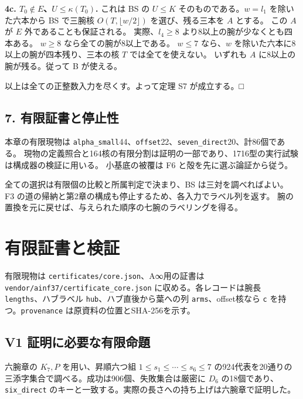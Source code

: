 \documentclass[
  10pt,
  a4paper,
]{article}
\begin{document}
\textbf{4c. \(T_0\notin E\)、\(U\le\kappa(T_0)\).} これは BS の
\(U\le K\) そのものである。\(w=l_1\) を除いた六本から BS で三腕核
\(O(T,\lfloor w/2\rfloor)\) を選び、残る三本を \(A\) とする。 この \(A\)
が \(E\) 外であることも保証される。 実際、\(l_4\ge8\)
より8以上の腕が少なくとも四本ある。 \(w\ge8\)
なら全ての腕が8以上である。 \(w\le7\) なら、\(w\)
を除いた六本に8以上の腕が四本残り、三本の核 \(T\) では全てを使えない。
いずれも \(A\) に8以上の腕が残る。従って B が使える。

以上は全ての正整数入力を尽くす。よって定理 S7 が成立する。□

\subsection{7.
有限証書と停止性}\label{ux6709ux9650ux8a3cux66f8ux3068ux505cux6b62ux6027}

本章の有限現物は
\texttt{alpha\_small}44、\texttt{offset}22、\texttt{seven\_direct}20、計86個である。
現物の定義照合と164核の有限分割は証明の一部であり、1716型の実行試験は構成器の検証に用いる。
小基底の被覆は F6 と殻を先に選ぶ論証から従う。

全ての選択は有限個の比較と所属判定で決まり、BS は三対を調べればよい。 F3
の道の帰納と第2章の構成も停止するため、各入力でラベル列を返す。
腕の置換を元に戻せば、与えられた順序の七腕のラベリングを得る。

\section{有限証書と検証}\label{ux6709ux9650ux8a3cux66f8ux3068ux691cux8a3c}

有限現物は \texttt{certificates/core.json}、A∞用の証書は
\texttt{vendor/ainf37/certificate\_core.json} に収める。各レコードは腕長
\texttt{lengths}、ハブラベル \texttt{hub}、ハブ直後から葉への列
\texttt{arms}、offset核なら \texttt{c} を持つ。\texttt{provenance}
は原資料の位置とSHA-256を示す。

\subsection{V1
証明に必要な有限命題}\label{v1-ux8a3cux660eux306bux5fc5ux8981ux306aux6709ux9650ux547dux984c}

六腕章の \(K_7,P\) を用い、昇順六つ組 \(1\le s_1\le\cdots\le s_6\le7\)
の924代表を20通りの三添字集合で調べる。成功は906個、失敗集合は厳密に
\(D_6\) の18個であり、\texttt{six\_direct}
のキーと一致する。実際の長さへの持ち上げは六腕章で証明した。
\end{document}
